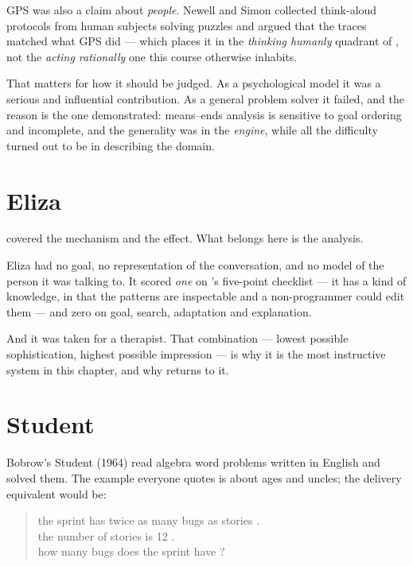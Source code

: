 \begin{conceptbox}
GPS was also a claim about \emph{people}. Newell and Simon collected think-aloud
protocols from human subjects solving puzzles and argued that the traces matched
what GPS did --- which places it in the \emph{thinking humanly} quadrant of
, not the \emph{acting rationally} one this course otherwise
inhabits.

That matters for how it should be judged. As a psychological model it was a serious
and influential contribution. As a general problem solver it failed, and the reason
is the one  demonstrated: means--ends analysis is sensitive to goal
ordering and incomplete, and the generality was in the \emph{engine}, while all the
difficulty turned out to be in describing the domain.
\end{conceptbox}

\section{Eliza}

 covered the mechanism and the effect. What belongs here is the analysis.

Eliza had no goal, no representation of the conversation, and no model of the person
it was talking to. It scored \emph{one} on 's five-point
checklist --- it has a kind of knowledge, in that the patterns are inspectable and a
non-programmer could edit them --- and zero on goal, search, adaptation and
explanation.

And it was taken for a therapist. That combination --- lowest possible sophistication,
highest possible impression --- is why it is the most instructive system in this
chapter, and why  returns to it.

\section{Student}

Bobrow's Student (1964) read algebra word problems written in English and solved
them. The example everyone quotes is about ages and uncles; the delivery equivalent
would be:

\begin{quote}\ttfamily\small
the sprint has twice as many bugs as stories .\\
the number of stories is 12 .\\
how many bugs does the sprint have ?
\end{quote}


